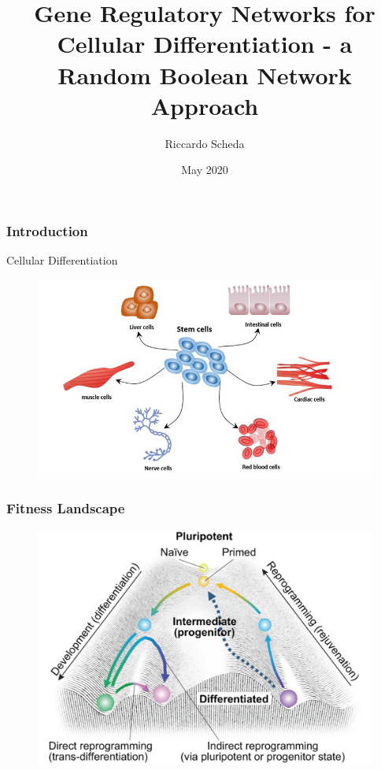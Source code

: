 \documentclass{beamer}
\title{Gene Regulatory Networks for Cellular Differentiation - a Random Boolean Network Approach}%
\institute[]{Applied Physics \\ University of Bologna}
\author{\Large{Riccardo Scheda}}
\date{May 2020}
\begin{document}
\begin{frame}
\maketitle
\end{frame}


\begin{frame}
\frametitle{Introduction}
\centering
Cellular Differentiation
\begin{figure}
\centering
\includegraphics[scale=0.4]{celldiff.jpg}
\end{figure}
\end{frame}

\begin{frame}
\frametitle{Fitness Landscape}
\centering

\begin{figure}
\centering
\includegraphics[scale=0.8]{landscape.jpg}
\end{figure}
\end{frame}
\end{document}
